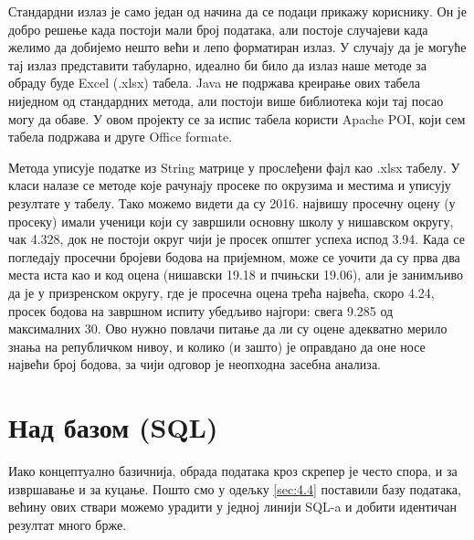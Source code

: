 Стандардни излаз је само један од начина да се подаци прикажу кориснику. Он је добро решење када постоји мали број података, али постоје случајеви када желимо да добијемо нешто већи и лепо форматиран излаз. У случају да је могуће тај излаз представити табуларно, идеално би било да излаз наше методе за обраду буде Excel (.xlsx) табела. Java не подржава креирање ових табела ниједном од стандардних метода, али постоји више библиотека који тај посао могу да обаве. У овом пројекту се за испис табела користи Apache POI, који сем табела подржава и друге Office formate.

Метода  уписује податке из String матрице у прослеђени фајл као .xlsx табелу. У класи  налазе се методе које рачунају просеке по окрузима и местима и уписују резултате у табелу. Тако можемо видети да су 2016. највишу просечну оцену (у просеку) имали ученици који су завршили основну школу у нишавском округу, чак 4.328, док не постоји округ чији је просек општег успеха испод 3.94. Када се погледају просечни бројеви бодова на пријемном, може се уочити да су прва два места иста као и код оцена (нишавски 19.18 и пчињски 19.06), али је занимљиво да је у призренском округу, где је просечна оцена трећа највећа, скоро 4.24, просек бодова на завршном испиту убедљиво најгори: свега 9.285 од максималних 30. Ово нужно повлачи питање да ли су оцене адекватно мерило знања на републичком нивоу, и колико (и зашто) је оправдано да оне носе највећи број бодова, за чији одговор је неопходна засебна анализа.

\section{Над базом (SQL)}

Иако концептуално базичнија, обрада података кроз скрепер је често спора, и за извршавање и за куцање. Пошто смо у одељку \ref{sec:4.4} поставили базу података, већину ових ствари можемо урадити у једној линији SQL-a и добити идентичан резултат много брже.

